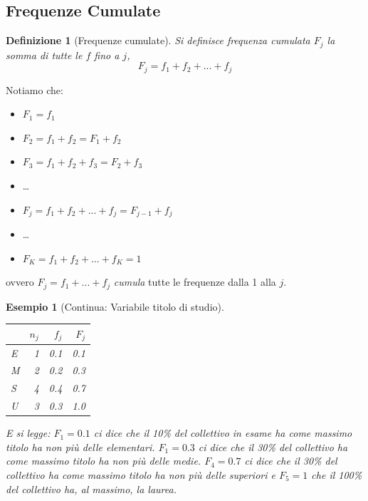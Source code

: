 \documentclass[
  11pt,
]{book}
\providecommand{\tightlist}{%
  \setlength{\itemsep}{0pt}\setlength{\parskip}{0pt}}
\theoremstyle{mytheoremstyle}
\theoremstyle{mydefstyle}
\newtheorem{definition}{Definizione}[section]
\newtheorem{example}{{Esempio}}[section]
\begin{document}
\subsection{Frequenze Cumulate}\label{frequenze-cumulate}

\begin{info}

\begin{definition}[Frequenze cumulate]
Si definisce frequenza cumulata \(F_j\) la somma di tutte le \(f\) fino a \(j\),
\[
F_j = f_1 + f_2 + ... + f_j
\]
\end{definition}

\end{info}

Notiamo che:

\begin{itemize}
\tightlist
\item
  \(F_1 = f_1\)
\item
  \(F_2= f_1+f_2=F_1+f_2\)
\item
  \(F_3= f_1+f_2+f_3=F_2+f_3\)
\item
  \ldots{}
\item
  \(F_j= f_1+f_2+...+f_j=F_{j-1}+f_j\)
\item
  \ldots{}
\item
  \(F_K= f_1+f_2+...+f_K=1\)
\end{itemize}

ovvero \(F_j=f_1+...+f_j\) \emph{cumula} tutte le frequenze dalla 1 alla \(j\).

\begin{example}[Continua: Variabile titolo di studio]
\(\phantom{.}\)

\begin{center}

\begin{table}[H]
\centering
\begin{tabular}[t]{lrrr}
\toprule
  & $n_j$ & $f_j$ & $F_j$\\
\midrule
E & 1 & 0.1 & 0.1\\
M & 2 & 0.2 & 0.3\\
S & 4 & 0.4 & 0.7\\
U & 3 & 0.3 & 1.0\\
\bottomrule
\end{tabular}
\end{table}

\end{center}

E si legge: \(F_1=0.1\) ci dice che il 10\% del collettivo in esame ha come massimo titolo ha non più delle elementari. \(F_1=0.3\) ci dice che il 30\% del collettivo ha come massimo titolo ha non più delle medie. \(F_4=0.7\) ci dice che il 30\% del collettivo ha come massimo titolo ha non più delle superiori e \(F_5=1\) che il 100\% del collettivo ha, al massimo, la laurea.
\end{example}
\end{document}
